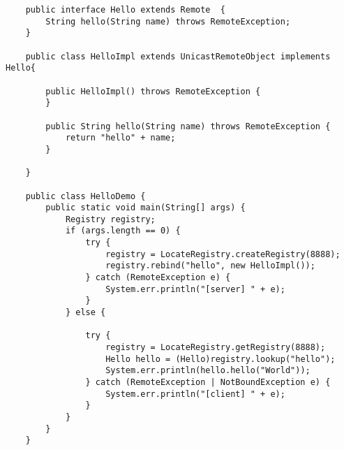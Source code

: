 \begin{verbatim}
    public interface Hello extends Remote  {
        String hello(String name) throws RemoteException;
    }

    public class HelloImpl extends UnicastRemoteObject implements Hello{

        public HelloImpl() throws RemoteException {
        }

        public String hello(String name) throws RemoteException {
            return "hello" + name;
        }

    }

    public class HelloDemo {
        public static void main(String[] args) {
            Registry registry;
            if (args.length == 0) {
                try {
                    registry = LocateRegistry.createRegistry(8888);
                    registry.rebind("hello", new HelloImpl());
                } catch (RemoteException e) {
                    System.err.println("[server] " + e);
                }
            } else {

                try {
                    registry = LocateRegistry.getRegistry(8888);
                    Hello hello = (Hello)registry.lookup("hello");
                    System.err.println(hello.hello("World"));
                } catch (RemoteException | NotBoundException e) {
                    System.err.println("[client] " + e);
                }
            }
        }
    }
\end{verbatim}